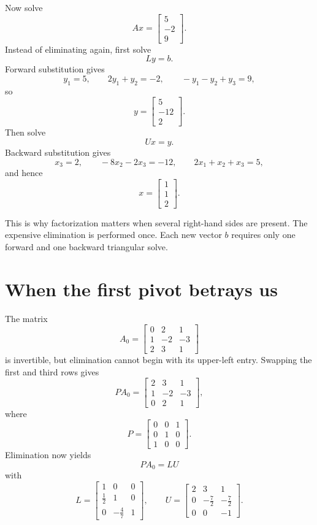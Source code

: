 Now solve
\[
  Ax=
  \begin{bmatrix}5\\-2\\9\end{bmatrix}.
\]
Instead of eliminating again, first solve
\[
  Ly=b.
\]
Forward substitution gives
\[
  y_1=5,
  \qquad
  2y_1+y_2=-2,
  \qquad
  -y_1-y_2+y_3=9,
\]
so
\[
  y=
  \begin{bmatrix}5\\-12\\2\end{bmatrix}.
\]
Then solve
\[
  Ux=y.
\]
Backward substitution gives
\[
  x_3=2,
  \qquad
  -8x_2-2x_3=-12,
  \qquad
  2x_1+x_2+x_3=5,
\]
and hence
\[
  x=
  \begin{bmatrix}1\\1\\2\end{bmatrix}.
\]

This is why factorization matters when several right-hand sides are present.  The expensive elimination is performed once.  Each new vector \(b\) requires only one forward and one backward triangular solve.

\section{When the first pivot betrays us}

The matrix
\[
  A_0=
  \begin{bmatrix}
    0&2&1\\
    1&-2&-3\\
    2&3&1
  \end{bmatrix}
\]
is invertible, but elimination cannot begin with its upper-left entry.  Swapping the first and third rows gives
\[
  PA_0=
  \begin{bmatrix}
    2&3&1\\
    1&-2&-3\\
    0&2&1
  \end{bmatrix},
\]
where
\[
  P=
  \begin{bmatrix}
    0&0&1\\
    0&1&0\\
    1&0&0
  \end{bmatrix}.
\]
Elimination now yields
\[
  PA_0=LU
\]
with
\[
  L=
  \begin{bmatrix}
    1&0&0\\
    \frac12&1&0\\
    0&-\frac47&1
  \end{bmatrix},
  \qquad
  U=
  \begin{bmatrix}
    2&3&1\\
    0&-\frac72&-\frac72\\
    0&0&-1
  \end{bmatrix}.
\]

